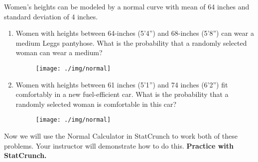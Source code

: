 Women's heights can be modeled by a normal curve with mean of 64 inches and standard deviation of 4 inches.
\begin{enumerate}
\item Women with heights between 64-inches (5'4'') and 68-inches (5'8'') can wear a medium Leggs pantyhose. What is the probability that a randomly selected woman can wear a medium? 
\begin{figure}[h]
\centering{}\texttt{[image: ./img/normal]} 
\end{figure}
\vspace{.5in}
\item Women with heights between 61 inches (5'1'') and 74 inches (6'2'') fit comfortably in a new fuel-efficient car. What is the probability that a randomly selected woman is comfortable in this car? 
\begin{figure}[h]
\centering{}\texttt{[image: ./img/normal]} 
\end{figure}
\vspace{.5in}

\end{enumerate} 
Now we will use the Normal Calculator in StatCrunch to work both of these problems. Your instructor will demonstrate how to do this. 
\newpage
\textbf{Practice with StatCrunch.} 
